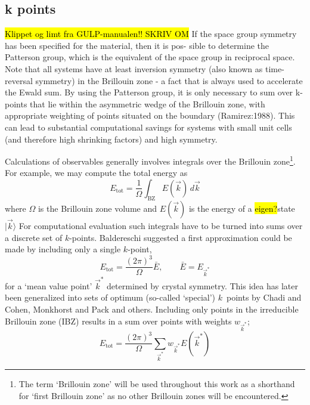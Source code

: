 \documentclass[11pt,bibliography=totoc,index=totoc]{scrbook}   %
\newcommand{\comment}[1]{\hl{#1}}
\begin{document}
\subsection{k points}

\begin{framed}
    \comment{Klippet og limt fra GULP-manualen!! SKRIV OM}
    If the space group symmetry has been specified for the material, then it is pos- sible to determine the Patterson group, which is the equivalent of the space group in reciprocal space. Note that all systems have at least inversion symmetry (also known as time-reversal symmetry) in the Brillouin zone - a fact that is always used to accelerate the Ewald sum. By using the Patterson group, it is only necessary to sum over k-points that lie within the asymmetric wedge of the Brillouin zone, with appropriate weighting of points situated on the boundary (Ramirez:1988). This can lead to substantial computational savings for systems with small unit cells (and therefore high shrinking factors) and high symmetry.
\end{framed}


Calculations of observables generally involves integrals over the Brillouin zone\footnote{The term `Brillouin zone' will be used throughout this work as
a shorthand for `first Brillouin zone' as no other Brillouin zones will be encountered.}. 
For example, we may compute the total energy as
\begin{equation}
  E_{\text{tot}} = \frac{1}{\Omega} \int_{\text{BZ}} E(\vec{k}) \,d\vec{k}
\end{equation}
where $\Omega$ is the Brillouin zone volume and $E(\vec{k})$ is the energy of a \comment{eigen?}state $|\vec{k}\rangle$
For computational evaluation such integrals have to be turned into sums over a discrete set of $k$-points. 
Baldereschi suggested a first approximation could be made by including only a single $k$-point,
\begin{equation}
  E_{\text{tot}} = \frac{(2\pi)^3}{\Omega} \bar{E}, \qquad \bar{E}=E_{\vec{k}^*}
\end{equation}
for a `mean value point' $\vec{k}^*$ determined by crystal symmetry\cite{Baldereschi:1973}. 
This idea has later been generalized into sets of optimum (so-called `special') $k$~points by Chadi and Cohen\cite{Chadi:1973},
Monkhorst and Pack\cite{MonkhorstPack:1976} and others.
Including only points in the irreducible Brillouin zone (IBZ) results in a sum over points with weights $w_{\vec{k}^*}$;
\begin{equation}
  E_{\text{tot}} = \frac{(2\pi)^3}{\Omega}\sum_{\vec{k}^*} w_{\vec{k}^*} E(\vec{k}^*)
\end{equation}
\end{document}
